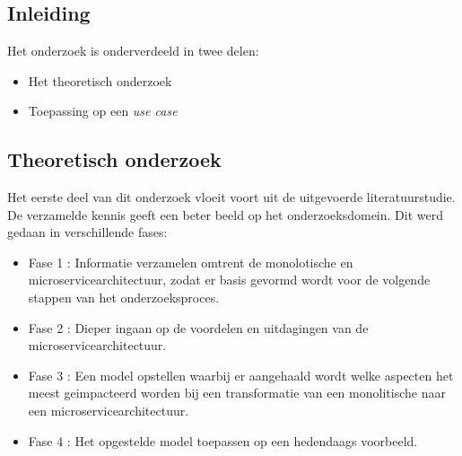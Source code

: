 
\chapter{}
\label{ch:methodologie}


\section{Inleiding}

Het onderzoek is onderverdeeld in twee delen:
\begin{itemize}
    \item Het theoretisch onderzoek
    \item Toepassing op een \emph{use case} 
\end{itemize}

\section{Theoretisch onderzoek}

Het eerste deel van dit onderzoek vloeit voort uit de uitgevoerde literatuurstudie. De verzamelde kennis geeft een beter beeld op het onderzoeksdomein. Dit werd gedaan in verschillende fases:

\begin{itemize}
    \item Fase 1 : Informatie verzamelen omtrent de monolotische en microservicearchitectuur, zodat er basis gevormd wordt voor de volgende stappen van het onderzoeksproces. 
    \item Fase 2 : Dieper ingaan op de voordelen en uitdagingen van de microservicearchitectuur.
    \item Fase 3 : Een model opstellen waarbij er aangehaald wordt welke aspecten het meest geimpacteerd worden bij een transformatie van een monolitische naar een microservicearchitectuur.
    \item Fase 4 : Het opgestelde model toepassen op een hedendaags voorbeeld.
\end{itemize}

